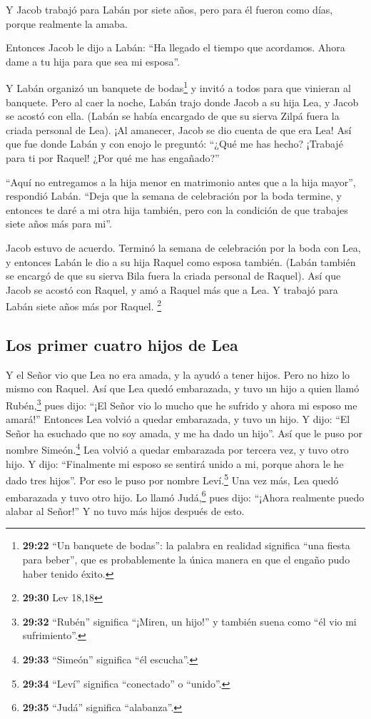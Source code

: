  Y Jacob trabajó para Labán por siete años, pero para él
fueron como días, porque realmente la amaba.

 Entonces Jacob le dijo a Labán: ``Ha llegado el tiempo
que acordamos. Ahora dame a tu hija para que sea mi esposa''.

 Y Labán organizó un banquete de bodas\footnote{\textbf{29:22}
  ``Un banquete de bodas'': la palabra en realidad significa ``una
  fiesta para beber'', que es probablemente la única manera en que el
  engaño pudo haber tenido éxito.} y invitó a todos para que vinieran al
banquete.  Pero al caer la noche, Labán trajo donde Jacob
a su hija Lea, y Jacob se acostó con ella.  (Labán se
había encargado de que su sierva Zilpá fuera la criada personal de Lea).
 ¡Al amanecer, Jacob se dio cuenta de que era Lea! Así
que fue donde Labán y con enojo le preguntó: ``¿Qué me has hecho?
¡Trabajé para ti por Raquel! ¿Por qué me has engañado?''

 ``Aquí no entregamos a la hija menor en matrimonio antes
que a la hija mayor'', respondió Labán.  ``Deja que la
semana de celebración por la boda termine, y entonces te daré a mi otra
hija también, pero con la condición de que trabajes siete años más para
mi''.

 Jacob estuvo de acuerdo. Terminó la semana de
celebración por la boda con Lea, y entonces Labán le dio a su hija
Raquel como esposa también.  (Labán también se encargó de
que su sierva Bila fuera la criada personal de Raquel). 
Así que Jacob se acostó con Raquel, y amó a Raquel más que a Lea. Y
trabajó para Labán siete años más por Raquel. \footnote{\textbf{29:30}
  Lev 18,18}

\hypertarget{los-primer-cuatro-hijos-de-lea}{%
\subsection{Los primer cuatro hijos de
Lea}\label{los-primer-cuatro-hijos-de-lea}}

 Y el Señor vio que Lea no era amada, y la ayudó a tener
hijos. Pero no hizo lo mismo con Raquel.  Así que Lea
quedó embarazada, y tuvo un hijo a quien llamó Rubén,\footnote{\textbf{29:32}
  ``Rubén'' significa ``¡Miren, un hijo!'' y también suena como ``él vio
  mi sufrimiento''.} pues dijo: ``¡El Señor vio lo mucho que he sufrido
y ahora mi esposo me amará!''  Entonces Lea volvió a
quedar embarazada, y tuvo un hijo. Y dijo: ``El Señor ha esuchado que no
soy amada, y me ha dado un hijo''. Así que le puso por nombre
Simeón.\footnote{\textbf{29:33} ``Simeón'' significa ``él escucha''.}
 Lea volvió a quedar embarazada por tercera vez, y tuvo
otro hijo. Y dijo: ``Finalmente mi esposo se sentirá unido a mi, porque
ahora le he dado tres hijos''. Por eso le puso por nombre
Leví.\footnote{\textbf{29:34} ``Leví'' significa ``conectado'' o
  ``unido''.}  Una vez más, Lea quedó embarazada y tuvo
otro hijo. Lo llamó Judá,\footnote{\textbf{29:35} ``Judá'' significa
  ``alabanza''.} pues dijo: ``¡Ahora realmente puedo alabar al Señor!''
Y no tuvo más hijos después de esto.

